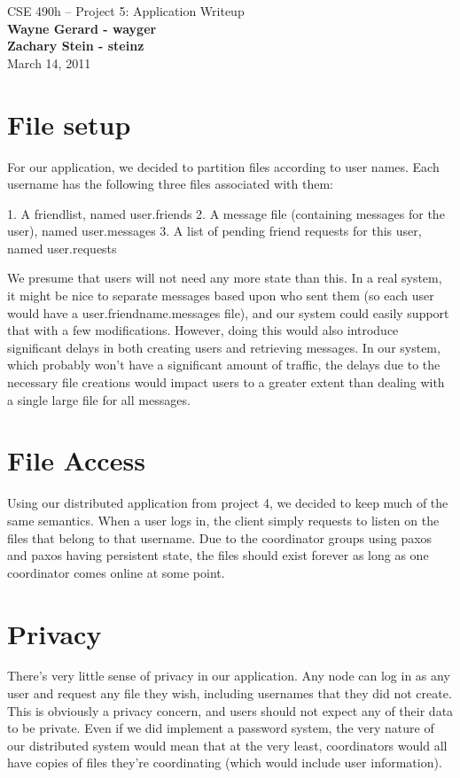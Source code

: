 \documentclass[11pt]{article}
\begin{document}
\begin{center}
{\large CSE 490h -- Project 5: Application Writeup} \\
\textbf{Wayne Gerard - wayger} \\
\textbf{Zachary Stein - steinz} \\
March 14, 2011
\end{center}

\section{File setup}

For our application, we decided to partition files according to user names. Each username has the following three files associated with them:

1. A friendlist, named user.friends
2. A message file (containing messages for the user), named user.messages
3. A list of pending friend requests for this user, named user.requests

We presume that users will not need any more state than this. In a real system, it might be nice to separate messages based upon who sent them (so each user would have a user.friendname.messages file), and our system could easily support that with a few modifications. However, doing this would also introduce significant delays in both creating users and retrieving messages. In our system, which probably won't have a significant amount of traffic, the delays due to the necessary file creations would impact users to a greater extent than dealing with a single large file for all messages.

\section{File Access}

Using our distributed application from project 4, we decided to keep much of the same semantics. When a user logs in, the client simply requests to listen on the files that belong to that username. Due to the coordinator groups using paxos and paxos having persistent state, the files should exist forever as long as one coordinator comes online at some point.


\section{Privacy}

There's very little sense of privacy in our application. Any node can log in as any user and request any file they wish, including usernames that they did not create. This is obviously a privacy concern, and users should not expect any of their data to be private. Even if we did implement a password system, the very nature of our distributed system would mean that at the very least, coordinators would all have copies of files they're coordinating (which would include user information). 
\end{document}
